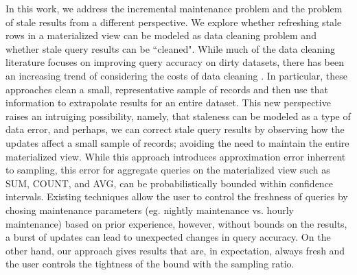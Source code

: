 In this work, we address the incremental maintenance problem and the problem of stale results from a different perspective.
We explore whether refreshing stale rows in a materialized view can be modeled as data cleaning problem and whether stale query results can be ``cleaned".
While much of the data cleaning literature focuses on improving query accuracy on dirty datasets,
there has been an increasing trend of considering the costs of data cleaning \cite{wang1999sample}.
In particular, these approaches clean a small, representative sample of records and then use that information to extrapolate results for an entire dataset.
This new perspective raises an intruiging possibility, namely, that staleness can be modeled as a type of data error, 
and perhaps, we can correct stale query results by observing how the updates affect a small sample of records; 
avoiding the need to maintain the entire materialized view.
While this approach introduces approximation error inherrent to sampling, this error for aggregate queries on the materialized view such as SUM, COUNT, and AVG, 
can be probabilistically bounded within confidence intervals.
Existing techniques allow the user to control the freshness of queries by chosing maintenance parameters (eg. nightly maintenance vs. hourly maintenance) based on prior experience, however, without bounds on the results, a burst of updates can lead to unexpected changes in query accuracy.
On the other hand, our approach gives results that are, in expectation, always fresh and the user controls the tightness of the bound with the sampling ratio.


